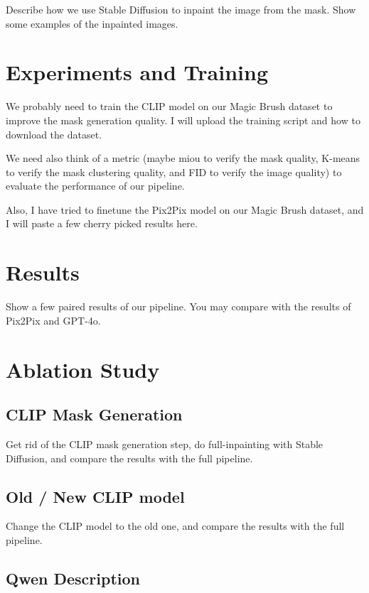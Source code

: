 \documentclass{article}
\begin{document}
Describe how we use Stable Diffusion to inpaint the image from the mask. Show some examples of the inpainted images.


\section{Experiments and Training}


We probably need to train the CLIP model on our Magic Brush dataset to improve the mask generation quality. I will upload the training script and how to download the dataset.


We need also think of a metric (maybe miou to verify the mask quality, K-means to verify the mask clustering quality, and FID to verify the image quality) to evaluate the performance of our pipeline.


Also, I have tried to finetune the Pix2Pix model on our Magic Brush dataset, and I will paste a few cherry picked results here.


\section{Results}


Show a few paired results of our pipeline. You may compare with the results of Pix2Pix and GPT-4o.


\section{Ablation Study}


\subsection{CLIP Mask Generation}


Get rid of the CLIP mask generation step, do full-inpainting with Stable Diffusion, and compare the results with the full pipeline.


\subsection{Old / New CLIP model}


Change the CLIP model to the old one, and compare the results with the full pipeline.


\subsection{Qwen Description}
\end{document}
